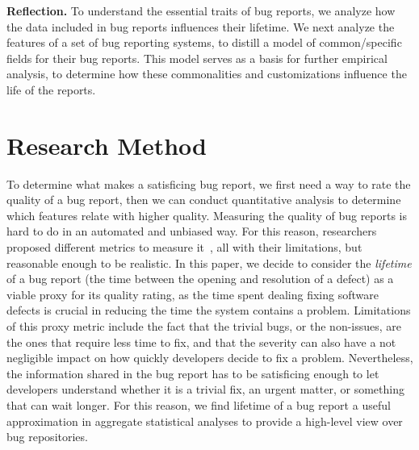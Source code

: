 %
%
%

{\bf Reflection.} To understand the essential traits of bug reports, we analyze how the data included in bug reports influences their lifetime.
We next analyze the features of a set of bug reporting systems, to distill a model of common/specific fields for their bug reports.
This model serves as a basis for further empirical analysis, to determine how these commonalities and customizations influence the life of the reports.


\section{Research Method} \label{sec:model-method}

To determine what makes a satisficing bug report, we first need a way to rate the quality of a bug report, then we can conduct quantitative analysis to determine which features relate with higher quality.
Measuring the quality of bug reports is hard to do in an automated and unbiased way.
For this reason, researchers proposed different metrics to measure it~\cite{Hooi2007}, all with their limitations, but reasonable enough to be realistic.
In this paper, we decide to consider the \emph{lifetime} of a bug report (\ie the time between the opening and resolution of a defect) as a viable proxy for its quality rating, as the time spent dealing fixing software defects is crucial in reducing the time the system contains a problem.
Limitations of this proxy metric include the fact that the trivial bugs, or the non-issues, are the ones that require less time to fix, and that the severity can also have a not negligible impact on how quickly developers decide to fix a problem.
Nevertheless, the information shared in the bug report has to be satisficing enough to let developers understand whether it is a trivial fix, an urgent matter, or something that can wait longer.
For this reason, we find lifetime of a bug report a useful approximation in aggregate statistical analyses to provide a high-level view over bug repositories.


